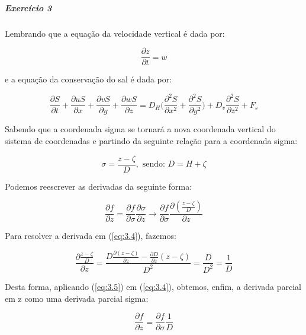 \documentclass[11pt]{article}
\begin{document}
    \subparagraph{Exercício 3}\label{exercuxedcio-3}

Lembrando que a equação da velocidade vertical é dada por:

\begin{equation}
    \frac{\partial{z}}{\partial{t}} = w
    \label{eq:3.1}
\end{equation}

e a equação da conservação do sal é dada por:

\begin{equation}
    \frac{\partial{S}}{\partial{t}} + \frac{\partial{uS}}{\partial{x}} + \frac{\partial{vS}}{\partial{y}} + \frac{\partial{wS}}{\partial{z}} = D_H\bigg( \frac{\partial^2{S}}{\partial{x^2}} + \frac{\partial^2{S}}{\partial{y^2}} \bigg) + D_v\frac{\partial^2{S}}{\partial{z^2}} + F_s
    \label{eq:3.2}
\end{equation}

Sabendo que a coordenada sigma se tornará a nova coordenada vertical do
sistema de coordenadas e partindo da seguinte relação para a coordenada
sigma:

\begin{equation}
    \sigma = \frac{z - \zeta}{D}, \text{ sendo: } D = H + \zeta
\end{equation}

Podemos reescrever as derivadas da seguinte forma:

\begin{equation}
    \frac{\partial{f}}{\partial{z}} = \frac{\partial{f}}{\partial{\sigma}}\frac{\partial{\sigma}}{\partial{z}} \rightarrow \frac{\partial{f}}{\partial{\sigma}}\frac{\partial(\frac{z - \zeta}{D})}{\partial{z}}
    \label{eq:3.4}
\end{equation}

Para resolver a derivada em (\ref{eq:3.4}), fazemos:

\begin{equation}
    \frac{\partial{\frac{z - \zeta}{D}}}{\partial{z}} = \frac{D\frac{\partial{(z - \zeta)}}{\partial{z}} - \frac{\partial{D}}{\partial{z}}(z - \zeta)}{D^2} = \frac{D}{D^2} = \frac{1}{D}
    \label{eq:3.5}
\end{equation}

Desta forma, aplicando (\ref{eq:3.5}) em (\ref{eq:3.4}), obtemos, enfim,
a derivada parcial em z como uma derivada parcial sigma:

\begin{equation}
    \frac{\partial{f}}{\partial{z}} = \frac{\partial{f}}{\partial{\sigma}}\frac{1}{D}
    \label{eq:3.6}
\end{equation}
\end{document}
